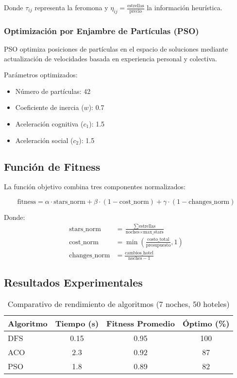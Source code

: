 \documentclass[runningheads]{llncs}
\begin{document}
Donde $\tau_{ij}$ representa la feromona y $\eta_{ij} = \frac{\text{estrellas}}{\text{precio}}$ la información heurística.

\subsubsection{Optimización por Enjambre de Partículas (PSO)}

PSO optimiza posiciones de partículas en el espacio de soluciones mediante actualización de velocidades basada en experiencia personal y colectiva.

Parámetros optimizados:
\begin{itemize}
\item Número de partículas: 42
\item Coeficiente de inercia ($w$): 0.7
\item Aceleración cognitiva ($c_1$): 1.5
\item Aceleración social ($c_2$): 1.5
\end{itemize}

\subsection{Función de Fitness}

La función objetivo combina tres componentes normalizados:

\begin{equation}
\text{fitness} = \alpha \cdot \text{stars\_norm} + \beta \cdot (1 - \text{cost\_norm}) + \gamma \cdot (1 - \text{changes\_norm})
\end{equation}

Donde:
\begin{align}
\text{stars\_norm} &= \frac{\sum \text{estrellas}}{\text{noches} \times \text{max\_stars}} \\
\text{cost\_norm} &= \min\left(\frac{\text{costo\_total}}{\text{presupuesto}}, 1\right) \\
\text{changes\_norm} &= \frac{\text{cambios\_hotel}}{\text{noches} - 1}
\end{align}

\subsection{Resultados Experimentales}

\begin{table}[H]
\centering
\begin{tabular}{lccc}
\toprule
\textbf{Algoritmo} & \textbf{Tiempo (s)} & \textbf{Fitness Promedio} & \textbf{Óptimo (\%)} \\
\midrule
DFS & 0.15 & 0.95 & 100 \\
ACO & 2.3 & 0.92 & 87 \\
PSO & 1.8 & 0.89 & 82 \\
\bottomrule
\end{tabular}
\caption{Comparativo de rendimiento de algoritmos (7 noches, 50 hoteles)}
\end{table}
\end{document}
